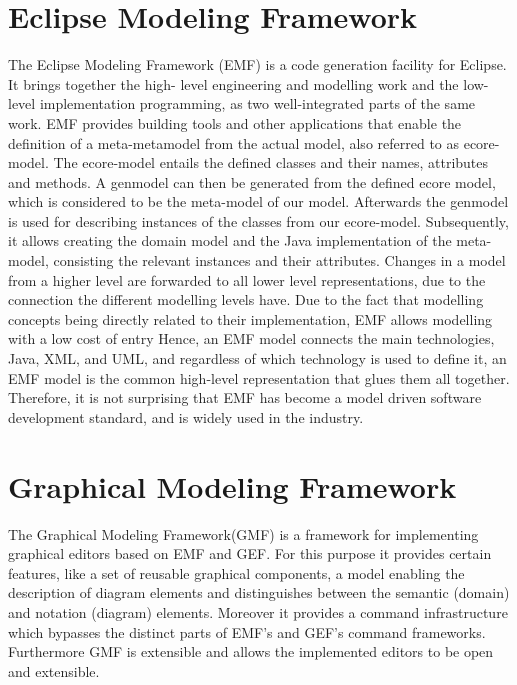 \section{Eclipse Modeling Framework}
The Eclipse Modeling Framework (EMF) is a code generation facility for Eclipse. It brings together the high- level engineering and modelling work and the low-level implementation programming, as two well-integrated parts of the same work. EMF provides building tools and other applications that enable the definition of a meta-metamodel from the actual model, also referred to as ecore-model. The ecore-model entails the defined classes and their names, attributes and methods. A genmodel can then be generated from the defined ecore model, which is considered to be the meta-model of our model. Afterwards the genmodel is used for describing instances of the classes from our ecore-model. Subsequently, it allows creating the domain model and the Java implementation of the meta-model, consisting the relevant instances and their attributes. Changes in a model from a higher level are forwarded to all lower level representations, due to the connection the different modelling levels have. Due to the fact that modelling concepts being directly related to their implementation, EMF allows modelling with a low cost of entry
Hence, an EMF model connects the main technologies, Java, XML, and UML, and regardless of which technology is used to define it, an EMF model is the common high-level representation that glues them all together. Therefore, it is not surprising that EMF has become a model driven software development standard, and is widely used in the industry.

\section{Graphical Modeling Framework}
The Graphical Modeling Framework(GMF) is a framework for implementing graphical editors based on EMF and GEF. For this purpose it provides certain features, like a set of reusable graphical components, a model enabling the description of diagram elements and distinguishes between the semantic (domain) and notation (diagram) elements. Moreover it provides a command infrastructure which bypasses the distinct parts of EMF's and GEF's command frameworks. Furthermore GMF is extensible and allows the implemented editors to be open and extensible.

